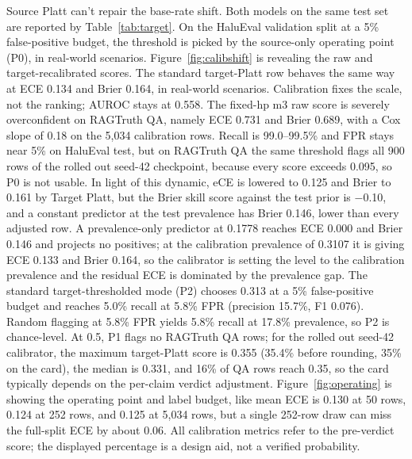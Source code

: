 \documentclass[a4paper,fleqn]{cas-sc}
\begin{document}
Source Platt can't repair the base-rate shift. Both models on the same test set are reported by Table~\ref{tab:target}. On the HaluEval validation split at a 5\% false-positive budget, the threshold is picked by the source-only operating point (P0), in real-world scenarios. Figure~\ref{fig:calibshift} is revealing the raw and target-recalibrated scores. The standard target-Platt row behaves the same way at ECE 0.134 and Brier 0.164, in real-world scenarios. Calibration fixes the scale, not the ranking; AUROC stays at 0.558. The fixed-hp m3 raw score is severely overconfident on RAGTruth QA, namely ECE 0.731 and Brier 0.689, with a Cox slope of 0.18 on the 5{,}034 calibration rows. Recall is 99.0--99.5\% and FPR stays near 5\% on HaluEval test, but on RAGTruth QA the same threshold flags all 900 rows of the rolled out seed-42 checkpoint, because every score exceeds 0.095, so P0 is not usable. In light of this dynamic, eCE is lowered to 0.125 and Brier to 0.161 by Target Platt, but the Brier skill score against the test prior is $-$0.10, and a constant predictor at the test prevalence has Brier 0.146, lower than every adjusted row. A prevalence-only predictor at 0.1778 reaches ECE 0.000 and Brier 0.146 and projects no positives; at the calibration prevalence of 0.3107 it is giving ECE 0.133 and Brier 0.164, so the calibrator is setting the level to the calibration prevalence and the residual ECE is dominated by the prevalence gap. The standard target-thresholded mode (P2) chooses 0.313 at a 5\% false-positive budget and reaches 5.0\% recall at 5.8\% FPR (precision 15.7\%, F1 0.076). Random flagging at 5.8\% FPR yields 5.8\% recall at 17.8\% prevalence, so P2 is chance-level. At 0.5, P1 flags no RAGTruth QA rows; for the rolled out seed-42 calibrator, the maximum target-Platt score is 0.355 (35.4\% before rounding, 35\% on the card), the median is 0.331, and 16\% of QA rows reach 0.35, so the card typically depends on the per-claim verdict adjustment. Figure~\ref{fig:operating} is showing the operating point and label budget, like mean ECE is 0.130 at 50 rows, 0.124 at 252 rows, and 0.125 at 5{,}034 rows, but a single 252-row draw can miss the full-split ECE by about 0.06. All calibration metrics refer to the pre-verdict score; the displayed percentage is a design aid, not a verified probability.
\end{document}
